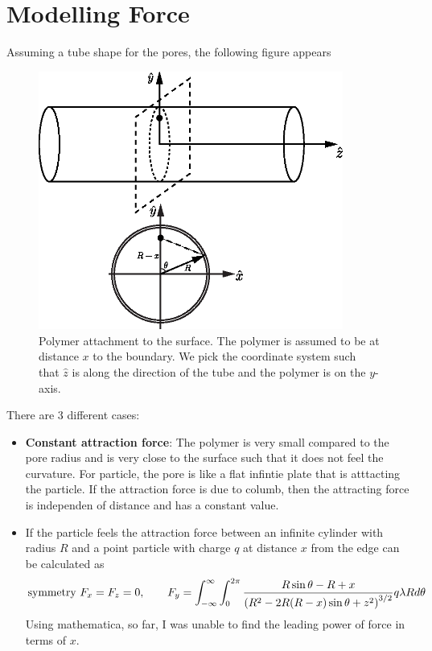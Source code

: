 \section{Modelling Force}
%
Assuming a tube shape for the pores, the following figure appears
%
\begin{figure}[h]
  \centering
  \includegraphics[width=10cm]{./Figs/polymer-attachment}
  \caption{Polymer attachment to the surface. The polymer is assumed
    to be at distance $x$ to the boundary. We pick the coordinate
    system such that $\hat{z}$ is along the direction of the tube and
    the polymer is on the ${y}$-axis. }
\end{figure}
%
There are 3 different cases:
%
\begin{itemize}
\item \textbf{Constant attraction force}: The polymer is very small compared to the pore radius and is
  very close to the surface such that it does not feel the
  curvature. For particle, the pore is like a flat infintie plate that
  is atttacting the particle. If the attraction force is due to
  columb, then the attracting force is independen of distance and has
  a constant value.

\item If the particle feels the attraction force between an infinite
  cylinder with radius $R$ and a point particle with charge $q$ at
  distance $x$ from the edge can be calculated as 
%
  \begin{align}
    \text{symmetry } F_{x}= F_{z} = 0, \qquad F_y = \int_{-\infty}^{\infty} \int_0^{2 \pi} \frac{R\sin\theta - R + x}{\left( R^{2} -2 R (R-x) \sin\theta + z^2\right)^{3/2}} q \lambda R d\theta   
  \end{align}
  Using mathematica, so far, I was unable to find the leading power of
  force in terms of $x$.
   
\end{itemize}



